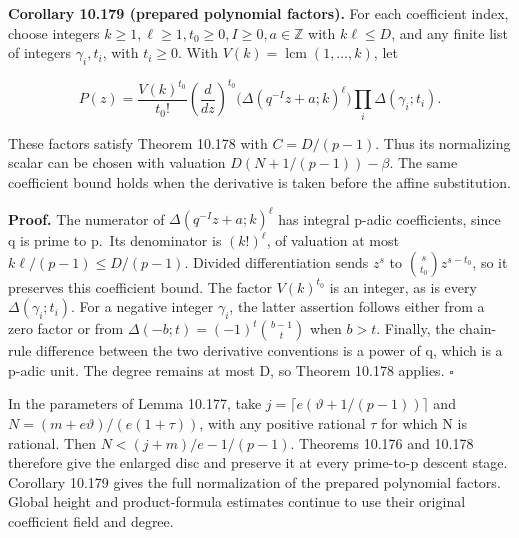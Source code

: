 \documentclass[
  11pt,
  a4paper,
]{article}
\begin{document}
\textbf{Corollary 10.179 (prepared polynomial factors).} For each
coefficient index, choose integers
\(k\ge1,\ell\ge1,t_0\ge0,I\ge0,a\in\mathbb Z\) with \(k\ell\le D\), and
any finite list of integers \(\gamma_i,t_i\), with \(t_i\ge0\). With
\(V(k)=\operatorname{lcm}(1,\ldots,k)\), let

\[
P(z)=\frac{V(k)^{t_0}}{t_0!}
 \left(\frac d{dz}\right)^{t_0}
 \bigl(\Delta(q^{-I}z+a;k)^\ell\bigr)
 \prod_i\Delta(\gamma_i;t_i).
\tag{10.677}
\]

These factors satisfy Theorem 10.178 with \(C=D/(p-1)\). Thus its
normalizing scalar can be chosen with valuation \(D(N+1/(p-1))-\beta\).
The same coefficient bound holds when the derivative is taken before the
affine substitution.

\textbf{Proof.} The numerator of \(\Delta(q^{-I}z+a;k)^\ell\) has
integral p-adic coefficients, since q is prime to p.~Its denominator is
\((k!)^\ell\), of valuation at most \(k\ell/(p-1)\le D/(p-1)\). Divided
differentiation sends \(z^s\) to \(\binom{s}{t_0}z^{s-t_0}\), so it
preserves this coefficient bound. The factor \(V(k)^{t_0}\) is an
integer, as is every \(\Delta(\gamma_i;t_i)\). For a negative integer
\(\gamma_i\), the latter assertion follows either from a zero factor or
from \(\Delta(-b;t)=(-1)^t\binom{b-1}{t}\) when \(b>t\). Finally, the
chain-rule difference between the two derivative conventions is a power
of q, which is a p-adic unit. The degree remains at most D, so Theorem
10.178 applies. \(\square\)

In the parameters of Lemma 10.177, take
\(j=\lceil e(\vartheta+1/(p-1))\rceil\) and
\(N=(m+e\vartheta)/(e(1+\tau))\), with any positive rational \(\tau\)
for which N is rational. Then \(N<(j+m)/e-1/(p-1)\). Theorems 10.176 and
10.178 therefore give the enlarged disc and preserve it at every
prime-to-p descent stage. Corollary 10.179 gives the full normalization
of the prepared polynomial factors. Global height and product-formula
estimates continue to use their original coefficient field and degree.
\end{document}
